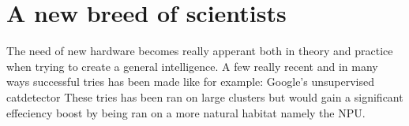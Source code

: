 \documentclass{article}
\begin{document}
\section{A new breed of scientists}
    The need of new hardware becomes really apperant both in
    theory and practice when trying to create a general intelligence.
    A few really recent and in many ways successful tries has been made
    like for example: Google's unsupervised catdetector %
    These tries has been ran on large clusters but would gain a
    significant effeciency boost by being ran on a more natural habitat namely the
    NPU. 


    
    
\end{document}
